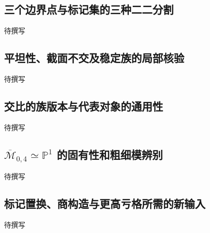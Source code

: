 \subsection{三个边界点与标记集的三种二二分割}
\label{g5:subsec:3406:05}
待撰写

\subsection{平坦性、截面不交及稳定族的局部核验}
\label{g5:subsec:3406:06}
待撰写

\subsection{交比的族版本与代表对象的通用性}
\label{g5:subsec:3406:07}
待撰写

\subsection{\texorpdfstring{\(\overline{\mathcal M}_{0,4}\simeq\mathbb P^1\) 的固有性和粗细模辨别}{\={M}\_\{0,4\}≃P¹ 的固有性和粗细模辨别}}
\label{g5:subsec:3406:08}
待撰写

\subsection{标记置换、商构造与更高亏格所需的新输入}
\label{g5:subsec:3406:09}
待撰写
